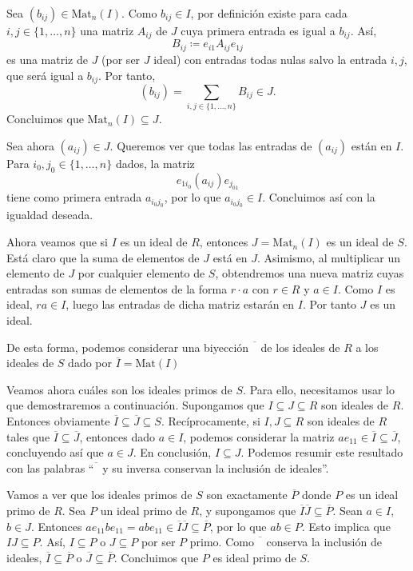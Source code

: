 \documentclass[11pt]{book}
\def\Mat{\mathrm{Mat}}
\theoremstyle{definition}
\begin{document}
Sea $(b_{ij})\in \mathrm{Mat}_n(I)$. Como $b_{ij}\in I$, por definición existe para cada $i,j\in\{1,\dots,n\}$ una matriz $A_{ij}$ de $J$ cuya primera entrada es igual a $b_{ij}$. Así, \[
B_{ij}\coloneq e_{i1}A_{ij}e_{1j}
\]es una matriz de $J$ (por ser $J$ ideal) con entradas todas nulas salvo la entrada $i,j$, que será igual a $b_{ij}$. Por tanto,\[
(b_{ij})=\sum_{i,j\in\{1,\dots, n\}}B_{ij}\in J.
\]Concluimos que $\mathrm{Mat}_n(I)\subseteq J$.

Sea ahora $(a_{ij})\in J$. Queremos ver que todas las entradas de $(a_{ij})$ están en $I$. Para $i_0,j_0\in\{1,\dots,n\}$ dados, la matriz\[
e_{1i_0}(a_{ij})e_{j_01}
\]tiene como primera entrada $a_{i_0j_0}$, por lo que $a_{i_0j_0}\in I$. Concluimos así con la igualdad deseada.

Ahora veamos que si $I$ es un ideal de $R$, entonces $J=\mathrm{Mat}_n(I)$ es un ideal de $S$. Está claro que la suma de elementos de $J$ está en $J$. Asimismo, al multiplicar un elemento de $J$ por cualquier elemento de $S$, obtendremos una nueva matriz cuyas entradas son sumas de elementos de la forma $r\cdot a$ con $r\in R$ y $a\in I$. Como $I$ es ideal, $ra\in I$, luego las entradas de dicha matriz estarán en $I$. Por tanto $J$ es un ideal.

De esta forma, podemos considerar una biyección $\overline{\phantom{I}}$ de los ideales de $R$ a los ideales de $S$ dado por $\overline I=\Mat(I)$

Veamos ahora cuáles son los ideales primos de $S$. Para ello, necesitamos usar lo que demostraremos a continuación. Supongamos que $I\subseteq J\subseteq R$ son ideales de $R$. Entonces obviamente $\overline I\subseteq\overline J\subseteq S$. Recíprocamente, si $I,J\subseteq R$ son ideales de $R$ tales que $\overline I\subseteq \overline J$, entonces dado $a\in I$, podemos considerar la matriz $ae_{11}\in\overline I\subseteq\overline J$, concluyendo así que $a\in J$. En conclusión, $I\subseteq J$. Podemos resumir este resultado con las palabras ``$\overline{\phantom{I}}$ y su inversa conservan la inclusión de ideales''.

Vamos a ver que los ideales primos de $S$ son exactamente $\overline P$ donde $P$ es un ideal primo de $R$. Sea $P$ un ideal primo de $R$, y supongamos que $\overline I\overline J\subseteq\overline P$. Sean $a\in I$, $b\in J$. Entonces $ae_{11}be_{11}=abe_{11}\in \overline I\overline J\subseteq\overline P$, por lo que $ab\in P$. Esto implica que $IJ\subseteq P$. Así, $I\subseteq P$ o $J\subseteq P$ por ser $P$ primo. Como $\overline{\phantom{I}}$ conserva la inclusión de ideales, $\overline I\subseteq \overline P$ o $\overline J\subseteq\overline P$. Concluimos que $P$ es ideal primo de $S$.
\end{document}
